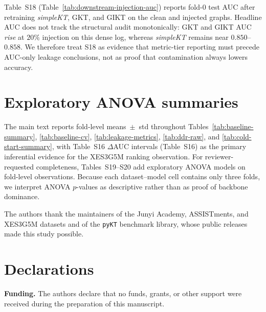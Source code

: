 \documentclass[pdflatex,sn-mathphys-num]{sn-jnl}
\begin{document}
Table~S18 (Table~\ref{tab:downstream-injection-auc}) reports fold-0 test AUC
after retraining \textit{simpleKT}, GKT, and GIKT on the clean and injected
graphs. Headline AUC does not track the structural audit monotonically: GKT
and GIKT AUC \emph{rise} at $20\%$ injection on this dense log, whereas
\textit{simpleKT} remains near $0.850$--$0.858$. We therefore treat S18 as
evidence that metric-tier reporting must precede AUC-only leakage
conclusions, not as proof that contamination always lowers accuracy.
\begin{table}[h!]
\centering
\caption{Downstream test AUC under controlled leak injection, XES3G5M fold~0 (Table S18)}
\label{tab:downstream-injection-auc}

\end{table}

\section{Exploratory ANOVA summaries}
\label{sec:supp-anova}
The main text reports fold-level means~$\pm$~std throughout
Tables~\ref{tab:baseline-summary}, \ref{tab:baseline-cv},
\ref{tab:leakage-metrics}, \ref{tab:ddr-raw}, and
\ref{tab:cold-start-summary}, with Table~S16 $\Delta$AUC intervals
(Table~S16) as the primary inferential evidence for the XES3G5M ranking
observation. For reviewer-requested completeness, Tables~S19--S20 add
exploratory ANOVA models on fold-level observations. Because each
dataset--model cell contains only three folds, we interpret ANOVA
$p$-values as descriptive rather than as proof of backbone dominance.





\backmatter

The authors thank the maintainers of the Junyi Academy, ASSISTments, and
XES3G5M datasets and of the \texttt{pyKT} benchmark library, whose public
releases made this study possible.

\section*{Declarations}

\noindent\textbf{Funding.} The authors declare that no funds, grants, or other
support were received during the preparation of this manuscript.
\end{document}
